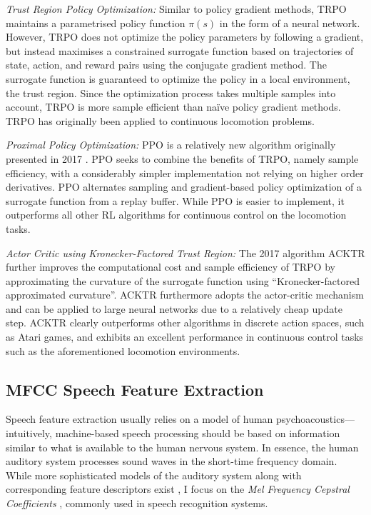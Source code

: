 \documentclass[letterpaper,10pt,conference]{ieeeconf}
\begin{document}
\emph{Trust Region Policy Optimization:} Similar to policy gradient methods, TRPO \cite{schulman2015trust} maintains a parametrised policy function $\pi(s)$ in the form of a neural network. However, TRPO does not optimize the policy parameters by following a gradient, but instead maximises a constrained surrogate function based on trajectories of state, action, and reward pairs using the conjugate gradient method. The surrogate function is guaranteed to optimize the policy in a local environment, the trust region. Since the optimization process takes multiple samples into account, TRPO is more sample efficient than na\"ive policy gradient methods. TRPO has originally been applied to continuous locomotion problems.

\emph{Proximal Policy Optimization:} PPO is a relatively new algorithm originally presented in 2017 \cite{schulman2017proximal}. PPO seeks to combine the benefits of TRPO, namely sample efficiency, with a considerably simpler implementation not relying on higher order derivatives. PPO alternates sampling and gradient-based policy optimization of a surrogate function from a replay buffer. While PPO is easier to implement, it outperforms all other RL algorithms for continuous control on the locomotion tasks.

\emph{Actor Critic using Kronecker-Factored Trust Region:} The 2017 algorithm ACKTR \cite{wu2017scalable} further improves the computational cost and sample efficiency of TRPO by approximating the curvature of the surrogate function using \enquote{Kronecker-factored approximated curvature}. ACKTR furthermore adopts the actor-critic mechanism and can be applied to large neural networks due to a relatively cheap update step. ACKTR clearly outperforms other algorithms in discrete action spaces, such as Atari games, and exhibits an excellent performance in continuous control tasks such as the aforementioned locomotion environments.

\subsection{MFCC Speech Feature Extraction}

Speech feature extraction usually relies on a model of human psychoacoustics---intuitively, machine-based speech processing should be based on information similar to what is available to the human nervous system. In essence, the human auditory system processes sound waves in the short-time frequency domain. While more sophisticated models of the auditory system along with corresponding feature descriptors exist \cite{murakami2015seeing}, I focus on the \emph{Mel Frequency Cepstral Coefficients} \cite{mermelstein1976distance}, commonly used in speech recognition systems.
\end{document}

